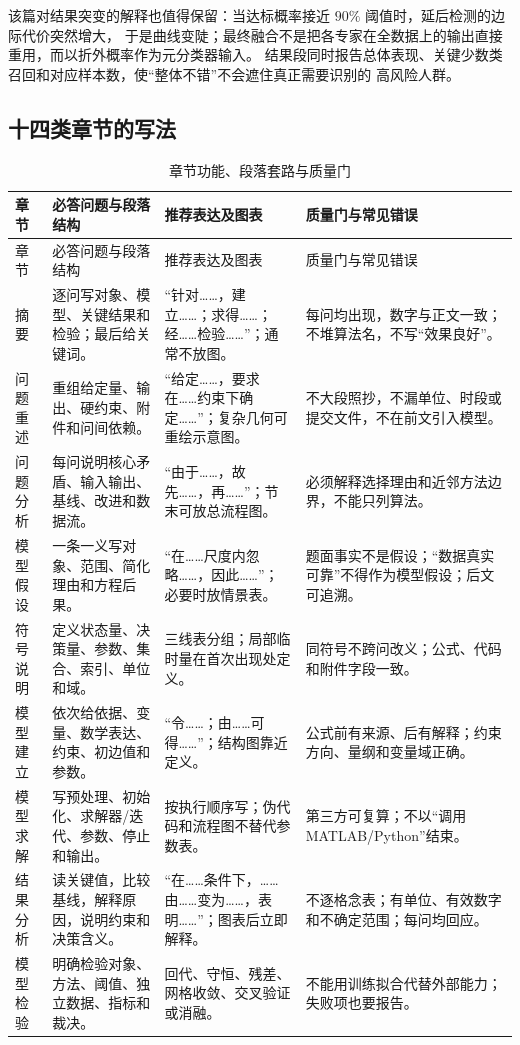 \documentclass[UTF8,a4paper,12pt]{ctexart}
\begin{document}
该篇对结果突变的解释也值得保留：当达标概率接近 $90\%$ 阈值时，延后检测的边际代价突然增大，
于是曲线变陡；最终融合不是把各专家在全数据上的输出直接重用，而以折外概率作为元分类器输入。
结果段同时报告总体表现、关键少数类召回和对应样本数，使“整体不错”不会遮住真正需要识别的
高风险人群。
\subsection{十四类章节的写法}

\begin{longtable}{p{1.8cm}p{4.2cm}p{4.0cm}p{4.0cm}}
\caption{章节功能、段落套路与质量门}\label{tab:sections}\\
\toprule
章节 & 必答问题与段落结构 & 推荐表达及图表 & 质量门与常见错误\\
\midrule
\endfirsthead
\toprule
章节 & 必答问题与段落结构 & 推荐表达及图表 & 质量门与常见错误\\
\midrule
\endhead
摘要 & 逐问写对象、模型、关键结果和检验；最后给关键词。 & “针对……，建立……；求得……；经……检验……”；通常不放图。 & 每问均出现，数字与正文一致；不堆算法名，不写“效果良好”。\\
问题重述 & 重组给定量、输出、硬约束、附件和问间依赖。 & “给定……，要求在……约束下确定……”；复杂几何可重绘示意图。 & 不大段照抄，不漏单位、时段或提交文件，不在前文引入模型。\\
问题分析 & 每问说明核心矛盾、输入输出、基线、改进和数据流。 & “由于……，故先……，再……”；节末可放总流程图。 & 必须解释选择理由和近邻方法边界，不能只列算法。\\
模型假设 & 一条一义写对象、范围、简化理由和方程后果。 & “在……尺度内忽略……，因此……”；必要时放情景表。 & 题面事实不是假设；“数据真实可靠”不得作为模型假设；后文可追溯。\\
符号说明 & 定义状态量、决策量、参数、集合、索引、单位和域。 & 三线表分组；局部临时量在首次出现处定义。 & 同符号不跨问改义；公式、代码和附件字段一致。\\
模型建立 & 依次给依据、变量、数学表达、约束、初边值和参数。 & “令……；由……可得……”；结构图靠近定义。 & 公式前有来源、后有解释；约束方向、量纲和变量域正确。\\
模型求解 & 写预处理、初始化、求解器/迭代、参数、停止和输出。 & 按执行顺序写；伪代码和流程图不替代参数表。 & 第三方可复算；不以“调用 MATLAB/Python”结束。\\
结果分析 & 读关键值，比较基线，解释原因，说明约束和决策含义。 & “在……条件下，……由……变为……，表明……”；图表后立即解释。 & 不逐格念表；有单位、有效数字和不确定范围；每问均回应。\\
模型检验 & 明确检验对象、方法、阈值、独立数据、指标和裁决。 & 回代、守恒、残差、网格收敛、交叉验证或消融。 & 不能用训练拟合代替外部能力；失败项也要报告。\\

\end{longtable}
\end{document}
